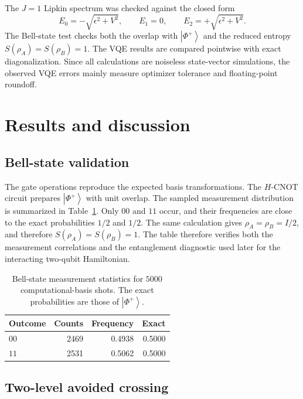 \documentclass[10pt,a4paper]{article}
\newcommand{\ket}[1]{\left|#1\right\rangle}
\begin{document}
The $J=1$ Lipkin spectrum was checked against the closed form
\begin{equation}
E_0=-\sqrt{\epsilon^2+V^2},\qquad E_1=0,\qquad E_2=+\sqrt{\epsilon^2+V^2}.
\end{equation}
The Bell-state test checks both the overlap with $\ket{\Phi^+}$ and the reduced entropy $S(\rho_A)=S(\rho_B)=1$. The VQE results are compared pointwise with exact diagonalization. Since all calculations are noiseless state-vector simulations, the observed VQE errors mainly measure optimizer tolerance and floating-point roundoff.

\section{Results and discussion}\label{sec:results}

\subsection{Bell-state validation}

The gate operations reproduce the expected basis transformations. The $H$-CNOT circuit prepares $\ket{\Phi^+}$ with unit overlap. The sampled measurement distribution is summarized in Table~\ref{tab:bell_measurements}. Only $00$ and $11$ occur, and their frequencies are close to the exact probabilities $1/2$ and $1/2$. The same calculation gives $\rho_A=\rho_B=I/2$, and therefore $S(\rho_A)=S(\rho_B)=1$. The table therefore verifies both the measurement correlations and the entanglement diagnostic used later for the interacting two-qubit Hamiltonian.

\begin{table}[H]
\centering
\caption{Bell-state measurement statistics for $5000$ computational-basis shots. The exact probabilities are those of $\ket{\Phi^+}$.}
\label{tab:bell_measurements}
\begin{tabular}{@{}lrrr@{}}
\toprule
Outcome & Counts & Frequency & Exact \\
\midrule
$00$ & 2469 & 0.4938 & 0.5000\\
$11$ & 2531 & 0.5062 & 0.5000\\
\bottomrule
\end{tabular}
\end{table}

\subsection{Two-level avoided crossing}
\end{document}
